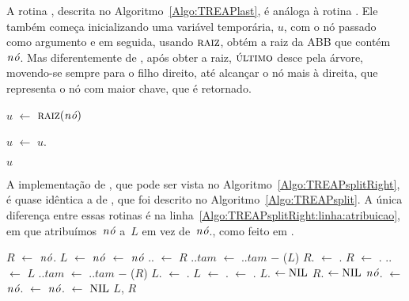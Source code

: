 A rotina \treapLast{}, descrita no Algoritmo~\ref{Algo:TREAPlast}, é análoga à rotina \treapFirst{}.
Ele também começa inicializando uma variável temporária, $u$, com o nó passado como argumento e em seguida, usando $\treapGetRoot$, obtém a raiz da ABB que contém $\node$.
Mas diferentemente de \treapFirst{}, após obter a raiz, $\treapLast$ desce pela árvore, movendo-se sempre para o filho direito, até alcançar o nó mais à direita, que representa o nó com maior chave, que é retornado.

\begin{algorithm}
\caption{\treapLast($\node$)}
\label{Algo:TREAPlast}
\begin{algorithmic}[1]
\State $u$ $\gets$ $\treapGetRoot(\node)$

  \State $u$ $\gets$ $u$.
\EndWhile

\State\Return $u$
\end{algorithmic}
\end{algorithm}

A implementação de \treapSplitRight{}, que pode ser vista no Algoritmo~\ref{Algo:TREAPsplitRight}, é quase idêntica a de \treapSplit{}, que foi descrito no Algoritmo~\ref{Algo:TREAPsplit}.
A única diferença entre essas rotinas é na linha~\ref{Algo:TREAPsplitRight:linha:atribuicao}, em que atribuímos~$\node$ a~$L$ em vez de~$\node$., como feito em \treapSplit{}.

\begin{algorithm}
\caption{\treapSplitRight($\node$)}
\label{Algo:TREAPsplitRight}
\begin{algorithmic}[1]
\State $R$ $\gets $ $\node$.
\State $L$ $\gets $ $\node$ \label{Algo:TREAPsplitRight:linha:atribuicao}
\State {} $\gets$ $\node$
    \State {}.. $\gets$ $R$
    \State {}..$tam$ $\gets$ ..$tam$ $\mathit{-}$ \treapGetSize($L$)
    \State $R$. $\gets$ .
    \EndIf
    \State $R$ $\gets$ .
  \Else
    \State {}.. $\gets$ $L$ 
    \State {}..$tam$ $\gets$ ..$tam$ $\mathit{-}$ \treapGetSize($R$)
    \State $L$. $\gets$ .
    \EndIf
    \State $L$ $\gets$ .
  \EndIf
  \State {} $\gets$ .
\EndWhile
{} $L$. $\gets\Nil$\EndIf
{} $R$. $\gets\Nil$\EndIf
\State $\node$. $\gets $ $\node$. $\gets$ $\node$. $\gets$ $\Nil$
\State\Return $L$, $R$
\end{algorithmic}
\end{algorithm}


